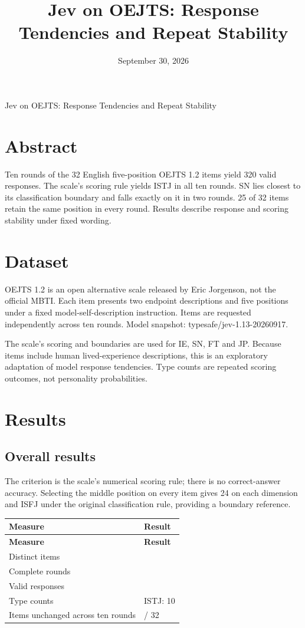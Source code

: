 \documentclass[10pt,a4paper]{article}
\title{\sffamily Jev on OEJTS: Response Tendencies and Repeat Stability}
\author{}
\date{September 30, 2026}
\begin{document}
\begin{center}{\sffamily\LARGE Jev on OEJTS: Response Tendencies and Repeat Stability\par}\vspace{8pt}{\small September 30, 2026}\end{center}\vspace{6pt}
\section*{Abstract}
Ten rounds of the 32 English five-position OEJTS 1.2 items yield 320 valid responses. The scale’s scoring rule yields ISTJ in all ten rounds. SN lies closest to its classification boundary and falls exactly on it in two rounds. 25 of 32 items retain the same position in every round. Results describe response and scoring stability under fixed wording.
\section{Dataset}
OEJTS 1.2 is an open alternative scale released by Eric Jorgenson, not the official MBTI. Each item presents two endpoint descriptions and five positions under a fixed model-self-description instruction. Items are requested independently across ten rounds. Model snapshot: typesafe/jev-1.13-20260917.

The scale’s scoring and boundaries are used for IE, SN, FT and JP. Because items include human lived-experience descriptions, this is an exploratory adaptation of model response tendencies. Type counts are repeated scoring outcomes, not personality probabilities.

\section{Results}
\subsection{Overall results}
The criterion is the scale’s numerical scoring rule; there is no correct-answer accuracy. Selecting the middle position on every item gives 24 on each dimension and ISFJ under the original classification rule, providing a boundary reference.

{\small
\begin{longtable}{@{}>{\raggedright\arraybackslash}p{}>{\raggedright\arraybackslash}p{}@{}}
\toprule
\textbf{Measure} & \textbf{Result}\\
\midrule
\endfirsthead
\toprule
\textbf{Measure} & \textbf{Result}\\
\midrule
\endhead
Distinct items & 32\\
Complete rounds & 10\\
Valid responses & 320\\
Type counts & ISTJ: 10\\
Items unchanged across ten rounds & 25 / 32\\
\bottomrule
\end{longtable}
}
\end{document}
